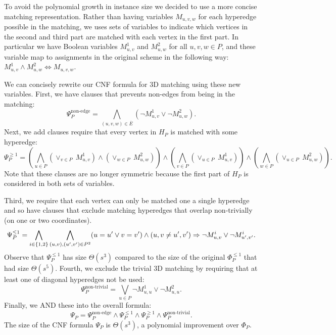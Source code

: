 \documentclass[11pt]{article}
\begin{document}
To avoid the polynomial growth in instance size we decided to use a
more concise matching representation.  Rather than having variables
$M_{u,v,w}$ for each hyperedge possible in the matching, we uses sets
of variables to indicate which vertices in the second and third part
are matched with each vertex in the first part.  In particular we have
Boolean variables $M_{u,v}^1$ and $M_{u,w}^2$ for all $u, v, w \in P$,
and these variable map to assignments in the original scheme in the
following way: $M_{u,v}^1 \wedge M_{u,w}^2 \Leftrightarrow M_{u,v,w}$.

We can concisely rewrite our CNF formula for 3D matching using these
new variables.  First, we have clauses that prevents non-edges from
being in the matching:
\begin{equation}
  \Psi_P^{\text{non-edge}} = \bigwedge_{(u,v,w) \in \overline{E}} (\neg M_{u,v}^1 \vee \neg M_{u,w}^2).
\end{equation}
Next, we add clauses require that every vertex in $H_P$ is matched with some
hyperedge:
\begin{equation}
  \Psi_P^{\ge 1} =
  \left(\bigwedge_{u \in P} (\vee_{v\in P} ~M_{u,v}^1) \wedge (\vee_{w \in P} ~M_{u,w}^2)\right)
  \wedge \left(\bigwedge_{v \in P} (\vee_{u \in P} ~M_{u,v}^1)\right)
  \wedge \left(\bigwedge_{w \in P} (\vee_{u \in P} ~M_{u,w}^2)\right).
\end{equation}
Note that these clauses are no longer symmetric because the first part
of $H_P$ is considered in both sets of variables.

Third, we require that each vertex can only be matched one a single
hyperedge and so have clauses that exclude matching hyperedges that
overlap non-trivially (on one or two coordinates).  
\begin{equation}
  \Psi_P^{\le 1} =
    \bigwedge_{i \in \left\{ 1,2 \right\}} \bigwedge_{(u,v), (u',v') \in P^2} (u = u' \vee v = v') \wedge (u,v \neq u',v') \Rightarrow \neg M_{u,v}^i \vee \neg M_{u',v'}^i.
\end{equation}
Observe that $\Psi_P^{\le 1}$ has size $\Theta(s^3)$ compared to the
size of the original $\Phi_P^{\le 1}$ that had size $\Theta(s^5)$.
Fourth, we exclude the trivial 3D matching by requiring that at least
one of diagonal hyperedges not be used:
\begin{equation}
  \Psi_P^{\text{non-trivial}} = \bigvee_{u \in P} \neg M_{u,u}^1 \vee \neg M_{u,u}^2.
\end{equation}
Finally, we AND these into the overall formula:
\begin{equation}
  \Psi_P = \Psi_P^{\text{non-edge}} \wedge \Psi_P^{\le 1} \wedge \Psi_P^{\ge 1} \wedge \Psi_P^{\text{non-trivial}}.
\end{equation}
The size of the CNF formula $\Psi_P$ is $\Theta(s^3)$, a polynomial improvement over $\Phi_P$.  
\end{document}
